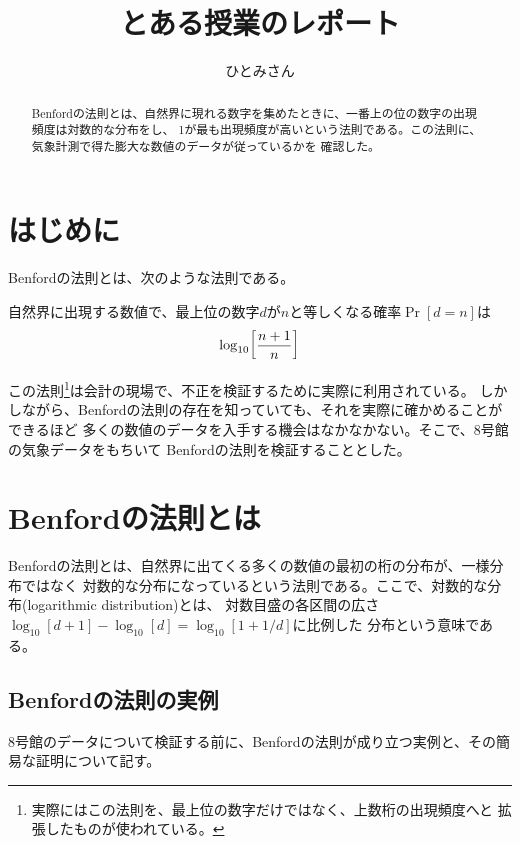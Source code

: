 \documentclass[jafontsize=9pt,twocolumn]{jlreq}
\begin{document}
\title{とある授業のレポート}
\author{ひとみさん}

\maketitle

\begin{abstract}
Benfordの法則とは、自然界に現れる数字を集めたときに、一番上の位の数字の出現頻度は対数的な分布をし、
1が最も出現頻度が高いという法則である。この法則に、気象計測で得た膨大な数値のデータが従っているかを
確認した。
\end{abstract}

\section{はじめに}

Benfordの法則とは、次のような法則である。

\begin{tcolorbox}[title={Benfordの法則}]
自然界に出現する数値で、最上位の数字$d$が$n$と等しくなる確率$\Pr[d=n]$は
\[\log_{10}\mleft[\frac{n+1}{n}\mright]\]
\end{tcolorbox}

この法則\footnote{実際にはこの法則を、最上位の数字だけではなく、上数桁の出現頻度へと
拡張したものが使われている。}は会計の現場で、不正を検証するために実際に利用されている。
しかしながら、Benfordの法則の存在を知っていても、それを実際に確かめることができるほど
多くの数値のデータを入手する機会はなかなかない。そこで、8号館の気象データをもちいて
Benfordの法則を検証することとした。


\section{Benfordの法則とは}

Benfordの法則とは、自然界に出てくる多くの数値の最初の桁の分布が、一様分布ではなく
対数的な分布になっているという法則である。ここで、対数的な分布(logarithmic distribution)とは、
対数目盛の各区間の広さ$\log_{10}[d+1]-\log_{10}[d]=\log_{10}[1+1/d]$に比例した
分布という意味である。

\subsection{Benfordの法則の実例}

8号館のデータについて検証する前に、Benfordの法則が成り立つ実例と、その簡易な証明について記す。
\end{document}

